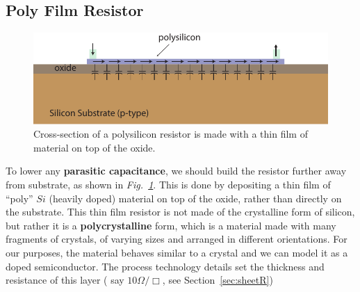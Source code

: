 \subsection{Poly Film Resistor}
\begin{figure}[tb]
\begin{center}
\includegraphics[width=.7\columnwidth]{poly_resistor}
\end{center}
\caption{Cross-section of a polysilicon resistor is made with a thin film of material on top of the oxide.}
\label{fig:mod2-2_ICtech_sld_6}
\end{figure}
To lower any \textbf{parasitic capacitance}, we should build the resistor further away from substrate, as shown in \emph{Fig.~\ref{fig:mod2-2_ICtech_sld_6}}. This is done by depositing a thin film of “poly” $Si$ (heavily doped) material on top of the oxide, rather than directly on the substrate.  This thin film resistor is not made of the crystalline form of silicon, but rather it is a \textbf{polycrystalline} form, which is a material made with many fragments of crystals, of varying sizes and arranged in different orientations.   For our purposes, the material behaves similar to a crystal and we can model it as a doped semiconductor.  The process technology details set the thickness and resistance of this layer ( say $10\Omega/\Box$, see Section~\ref{sec:sheetR})

